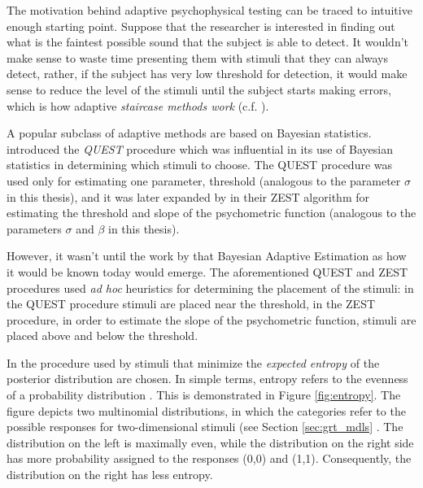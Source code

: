 \documentclass{article}\usepackage{knitr}
\begin{document}
The motivation behind adaptive psychophysical testing can be traced to intuitive enough starting point. Suppose that the researcher is interested in finding out what is the faintest possible sound that the subject is able to detect. It wouldn't make sense to waste time presenting them with stimuli that they can always detect, rather, if the subject has very low threshold for detection, it would make sense to reduce the level of the stimuli until the subject starts making errors, which is how adaptive \textit{staircase methods work} (c.f. \citet[Chapter 5]{kingdomprins2010}).

A popular subclass of adaptive methods are based on Bayesian statistics. \cite{watson1983} introduced the \textit{QUEST} procedure which was influential in its use of Bayesian statistics in determining which stimuli to choose. The QUEST procedure was used only for estimating one parameter, threshold (analogous to the parameter $\sigma$ in this thesis),  and it was later expanded by \citet{king_smith1997} in their ZEST algorithm for estimating the threshold and slope of the psychometric function (analogous to the parameters $\sigma$ and $\beta$ in this thesis). 

However, it wasn't until the work by \citet{kontsevichtyler1999} that Bayesian Adaptive Estimation as how it would be known today would emerge. The aforementioned QUEST and ZEST procedures used \textit{ad hoc} heuristics for determining the placement of the stimuli: in the QUEST procedure stimuli are placed near the threshold, in the ZEST procedure, in order to estimate the slope of the psychometric function, stimuli are placed above and below the threshold. 

In the procedure used by \citet{kontsevichtyler1999} stimuli that minimize the \textit{expected entropy} of the posterior distribution are chosen. In simple terms, entropy refers to the evenness of a probability distribution \citep[p. 365]{kruschke2015}. This is demonstrated in Figure \ref{fig:entropy}. The figure depicts two multinomial distributions, in which the categories refer to the possible responses for two-dimensional stimuli (see Section \ref{sec:grt_mdls} \textit{}. The distribution on the left is maximally even, while the distribution on the right side has more probability assigned to the responses (0,0) and (1,1). Consequently, the distribution on the right has less entropy.
\end{document}
